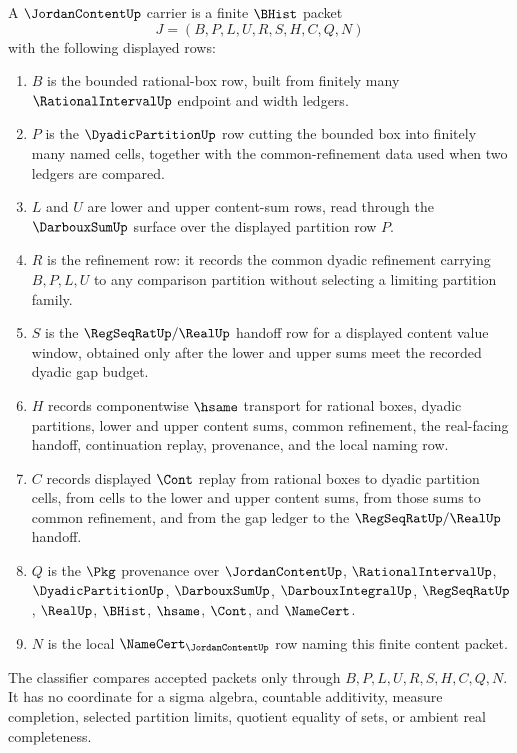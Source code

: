 \begin{definition}
\label{def:jordan-content-carrier}
A $\JordanContentUp$ carrier is a finite $\BHist$ packet
$$
J=(B,P,L,U,R,S,H,C,Q,N)
$$
with the following displayed rows:
\begin{enumerate}
\item $B$ is the bounded rational-box row, built from finitely many $\RationalIntervalUp$ endpoint and width ledgers.
\item $P$ is the $\DyadicPartitionUp$ row cutting the bounded box into finitely many named cells, together with the common-refinement data used when two ledgers are compared.
\item $L$ and $U$ are lower and upper content-sum rows, read through the $\DarbouxSumUp$ surface over the displayed partition row $P$.
\item $R$ is the refinement row: it records the common dyadic refinement carrying $B,P,L,U$ to any comparison partition without selecting a limiting partition family.
\item $S$ is the $\RegSeqRatUp/\RealUp$ handoff row for a displayed content value window, obtained only after the lower and upper sums meet the recorded dyadic gap budget.
\item $H$ records componentwise $\hsame$ transport for rational boxes, dyadic partitions, lower and upper content sums, common refinement, the real-facing handoff, continuation replay, provenance, and the local naming row.
\item $C$ records displayed $\Cont$ replay from rational boxes to dyadic partition cells, from cells to the lower and upper content sums, from those sums to common refinement, and from the gap ledger to the $\RegSeqRatUp/\RealUp$ handoff.
\item $Q$ is the $\Pkg$ provenance over $\JordanContentUp$, $\RationalIntervalUp$, $\DyadicPartitionUp$, $\DarbouxSumUp$, $\DarbouxIntegralUp$, $\RegSeqRatUp$, $\RealUp$, $\BHist$, $\hsame$, $\Cont$, and $\NameCert$.
\item $N$ is the local $\NameCert_{\JordanContentUp}$ row naming this finite content packet.
\end{enumerate}
The classifier compares accepted packets only through $B,P,L,U,R,S,H,C,Q,N$. It has no coordinate for a sigma algebra, countable additivity, measure completion, selected partition limits, quotient equality of sets, or ambient real completeness.
\end{definition}

